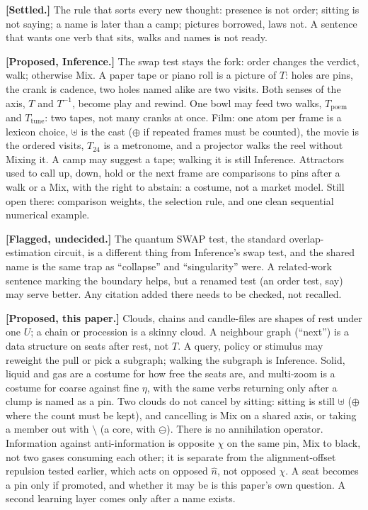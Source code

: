 \documentclass[12pt, a4paper]{article}
\begin{document}
\textbf{[Settled.]} The rule that sorts every new thought: presence is
not order; sitting is not saying; a name is later than a camp;
pictures borrowed, laws not. A sentence that wants one verb that
sits, walks and names is not ready.

\textbf{[Proposed, Inference.]} The swap test stays the fork: order
changes the verdict, walk; otherwise Mix. A paper tape or piano roll
is a picture of $T$: holes are pins, the crank is cadence, two holes
named alike are two visits. Both senses of the axis, $T$ and
$T^{-1}$, become play and rewind. One bowl may feed two walks,
$T_{\mathrm{poem}}$ and $T_{\mathrm{tune}}$: two tapes, not many
cranks at once. Film: one atom per frame is a lexicon choice,
$\uplus$ is the cast ($\oplus$ if repeated frames must be counted), the movie is the ordered visits, $T_{24}$ is a
metronome, and a projector walks the reel without Mixing it. A camp
may suggest a tape; walking it is still Inference. Attractors used
to call up, down, hold or the next frame are comparisons to pins
after a walk or a Mix, with the right to abstain: a costume, not a
market model. Still open there: comparison weights, the selection
rule, and one clean sequential numerical example.

\textbf{[Flagged, undecided.]} The quantum SWAP test, the standard
overlap-estimation circuit, is a different thing from Inference's
swap test, and the shared name is the same trap as ``collapse'' and
``singularity'' were. A related-work sentence marking the boundary
helps, but a renamed test (an order test, say) may serve better. Any
citation added there needs to be checked, not recalled.

\textbf{[Proposed, this paper.]} Clouds, chains and candle-files are
shapes of rest under one $U$; a chain or procession is a skinny
cloud. A neighbour graph (``next'') is a data structure on seats
after rest, not $T$. A query, policy or stimulus may reweight the
pull or pick a subgraph; walking the subgraph is Inference. Solid,
liquid and gas are a costume for how free the seats are, and
multi-zoom is a costume for coarse against fine $\eta$, with the
same verbs returning only after a clump is named as a pin. Two
clouds do not cancel by sitting: sitting is still $\uplus$ ($\oplus$ where the count must be kept), and cancelling is Mix on a shared axis,
or taking a member out with $\setminus$ (a core, with $\ominus$). There is no
annihilation operator. Information against anti-information is
opposite $\chi$ on the same pin, Mix to black, not two gases
consuming each other; it is separate from the alignment-offset
repulsion tested earlier, which acts on opposed $\hat n$, not
opposed $\chi$. A seat becomes a pin only if promoted, and whether
it may be is this paper's own question. A second learning layer
comes only after a name exists.
\end{document}
